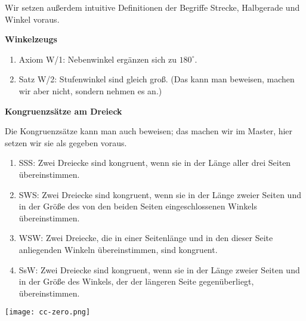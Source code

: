 \documentclass[12pt,a4paper,oneside,ngerman]{article}
\begin{document}
Wir setzen außerdem intuitive Definitionen der Begriffe Strecke, Halbgerade und Winkel voraus.
\newpage

\textbf{Winkelzeugs}
\begin{enumerate}
\item Axiom W/1: Nebenwinkel ergänzen sich zu $180^\circ$.
\item Satz W/2: Stufenwinkel sind gleich groß. (Das kann man beweisen, machen wir aber nicht, sondern nehmen es an.)
\end{enumerate}

\textbf{Kongruenzsätze am Dreieck}

Die Kongruenzsätze kann man auch beweisen; das machen wir im Master, hier setzen wir sie als gegeben voraus.
\begin{enumerate}
\item SSS: Zwei Dreiecke sind kongruent, wenn sie in der Länge aller drei Seiten übereinstimmen. 
\item SWS: Zwei Dreiecke sind kongruent, wenn sie in der Länge zweier Seiten und in der Größe des von den beiden Seiten eingeschlossenen Winkels übereinstimmen. 
\item WSW: Zwei Dreiecke, die in einer Seitenlänge und in den dieser Seite anliegenden Winkeln übereinstimmen, sind kongruent.
\item SsW: Zwei Dreiecke sind kongruent, wenn sie in der Länge zweier Seiten und in der Größe des Winkels, der der längeren Seite gegenüberliegt, übereinstimmen. 
\end{enumerate}


\vspace*{10mm}
\texttt{[image: cc-zero.png]}
\end{document}
